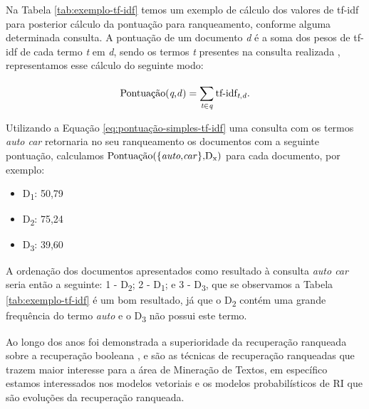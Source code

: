     
    
    Na Tabela \ref{tab:exemplo-tf-idf} temos um exemplo de cálculo dos valores de tf-idf para posterior cálculo da pontuação para ranqueamento, conforme alguma determinada consulta. 
    A pontuação de um documento \textit{d} é a soma dos pesos de tf-idf de cada termo \textit{t} em \textit{d}, sendo os termos \textit{t} presentes na consulta realizada \cite[p.~109]{Manning2008IIR}, representamos esse cálculo do seguinte modo:
    
    \begin{equation}
        \label{eq:pontuação-simples-tf-idf}
        \text{Pontuação(\textit{q},\textit{d})} = \sum_{\textit{t} \in \textit{q}}^{} \text{tf-idf}_{\text{\textit{t},\textit{d}}}.
    \end{equation}
    
    
    Utilizando a Equação \ref{eq:pontuação-simples-tf-idf} uma consulta com os termos \textit{auto car} retornaria no seu ranqueamento os documentos com a seguinte pontuação, calculamos $\text{Pontuação(\{\textit{auto},\textit{car}\},D\textsubscript{x})}$ para cada documento, por exemplo:
    \begin{itemize}
        \setlength\itemsep{-0.2em}
        \item D\textsubscript{1}: 50,79
        \item D\textsubscript{2}: 75,24
        \item D\textsubscript{3}: 39,60
    \end{itemize}
    
    A ordenação dos documentos apresentados como resultado à consulta \textit{auto car} seria então a seguinte: 1\textordmasculine{} - D\textsubscript{2}; 2\textordmasculine{} - D\textsubscript{1}; e 3\textordmasculine{} - D\textsubscript{3}, que se observamos a Tabela \ref{tab:exemplo-tf-idf} é um bom resultado, já que o D\textsubscript{2} contém uma grande frequência do termo \textit{auto} e o D\textsubscript{3} não possui este termo.
    
    
    Ao longo dos anos foi demonstrada a superioridade da recuperação ranqueada sobre a recuperação booleana \cite{Jones:1981:IRE:539571}, e são as técnicas de recuperação ranqueadas que trazem maior interesse para a área de Mineração de Textos, em específico estamos interessados nos modelos vetoriais e os modelos probabilísticos de RI que são evoluções da recuperação ranqueada.
    
